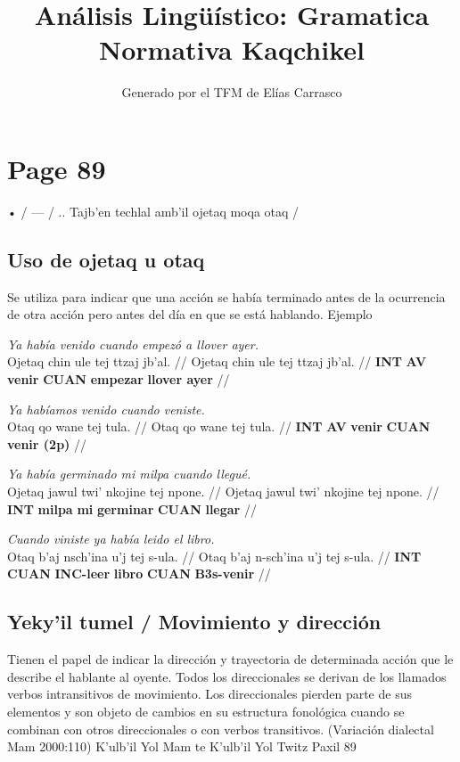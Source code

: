 \documentclass{article}%
\title{Análisis Lingüístico: Gramatica Normativa Kaqchikel}%
\author{Generado por el TFM de Elías Carrasco}%
\begin{document}
%
\normalsize%
\maketitle%
\section{Page 89}%
\label{sec:Page89}%
• / — / .. Tajb'en techlal amb'il ojetaq moqa otaq / %
\subsection{Uso de ojetaq u otaq}%
\label{subsec:Usodeojetaquotaq}%

%
Se utiliza para indicar que una acción se había terminado antes %
de la ocurrencia de otra acción pero antes del día en que se %
está hablando. %
Ejemplo %
\par\medskip%
\ex
\textit{Ya había venido cuando empezó a llover ayer.} \\
\begingl
\gla Ojetaq chin ule tej ttzaj jb'al. //
\glb Ojetaq chin ule tej ttzaj jb'al. //
\glc \textbf{INT} \textbf{AV} \textbf{venir} \textbf{CUAN} \textbf{empezar} \textbf{llover ayer} //
\endgl
\xe
%
\medskip%
\par\medskip%
\ex
\textit{Ya habíamos venido cuando veniste.} \\
\begingl
\gla Otaq qo wane tej tula. //
\glb Otaq qo wane tej tula. //
\glc \textbf{INT} \textbf{AV} \textbf{venir} \textbf{CUAN} \textbf{venir (2p)} //
\endgl
\xe
%
\medskip%
\par\medskip%
\ex
\textit{Ya había germinado mi milpa cuando llegué.} \\
\begingl
\gla Ojetaq jawul twi' nkojine tej npone. //
\glb Ojetaq jawul twi' nkojine tej npone. //
\glc \textbf{INT} \textbf{milpa} \textbf{mi} \textbf{germinar} \textbf{CUAN} \textbf{llegar} //
\endgl
\xe
%
\medskip%
\par\medskip%
\ex
\textit{Cuando viniste ya había leido el libro.} \\
\begingl
\gla Otaq b'aj nsch'ina u'j tej s-ula. //
\glb Otaq b'aj n-sch'ina u'j tej s-ula. //
\glc \textbf{INT} \textbf{CUAN} \textbf{INC-}\textbf{leer} \textbf{libro} \textbf{CUAN} \textbf{B3s-}\textbf{venir} //
\endgl
\xe
%
\medskip%
\subsection{Yeky'il tumel / Movimiento y dirección}%
\label{subsec:Yekyiltumel/Movimientoydireccin}%

%
Tienen el papel de indicar la dirección y trayectoria de determinada acción que le describe el hablante al oyente. Todos los direccionales se derivan de los llamados verbos intransitivos de movimiento. Los direccionales pierden parte de sus elementos y son objeto de cambios en su estructura fonológica cuando se combinan con otros direccionales o con verbos transitivos. (Variación dialectal Mam 2000:110) %
K'ulb'il Yol Mam te K'ulb'il Yol Twitz Paxil 89 

%
\end{document}
